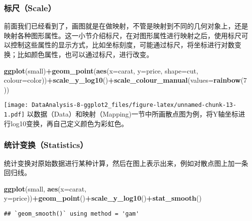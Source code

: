 \documentclass[]{article}
\newenvironment{Shaded}{\begin{snugshade}}{\end{snugshade}}
\newcommand{\KeywordTok}[1]{\textcolor[rgb]{0.13,0.29,0.53}{\textbf{#1}}}
\newcommand{\DataTypeTok}[1]{\textcolor[rgb]{0.13,0.29,0.53}{#1}}
\newcommand{\DecValTok}[1]{\textcolor[rgb]{0.00,0.00,0.81}{#1}}
\newcommand{\OperatorTok}[1]{\textcolor[rgb]{0.81,0.36,0.00}{\textbf{#1}}}
\newcommand{\NormalTok}[1]{#1}
\begin{document}
\subsubsection{标尺（Scale）}\label{scale}

前面我们已经看到了，画图就是在做映射，不管是映射到不同的几何对象上，还是映射各种图形属性。这一小节介绍标尺，在对图形属性进行映射之后，使用标尺可以控制这些属性的显示方式，比如坐标刻度，可能通过标尺，将坐标进行对数变换；比如颜色属性，也可以通过标尺，进行改变。

\begin{Shaded}
\begin{Highlighting}[]
\KeywordTok{ggplot}\NormalTok{(small)}\OperatorTok{+}\KeywordTok{geom_point}\NormalTok{(}\KeywordTok{aes}\NormalTok{(}\DataTypeTok{x=}\NormalTok{carat, }\DataTypeTok{y=}\NormalTok{price, }\DataTypeTok{shape=}\NormalTok{cut, }\DataTypeTok{colour=}\NormalTok{color))}\OperatorTok{+}\KeywordTok{scale_y_log10}\NormalTok{()}\OperatorTok{+}\KeywordTok{scale_colour_manual}\NormalTok{(}\DataTypeTok{values=}\KeywordTok{rainbow}\NormalTok{(}\DecValTok{7}\NormalTok{))}
\end{Highlighting}
\end{Shaded}

\texttt{[image: DataAnalysis-8-ggplot2\_files/figure-latex/unnamed-chunk-13-1.pdf]}
以数据（Data）和映射（Mapping)一节中所画散点图为例，将Y轴坐标进行log10变换，再自己定义颜色为彩虹色。

\subsubsection{统计变换（Statistics）}\label{statistics}

统计变换对原始数据进行某种计算，然后在图上表示出来，例如对散点图上加一条回归线。

\begin{Shaded}
\begin{Highlighting}[]
\KeywordTok{ggplot}\NormalTok{(small, }\KeywordTok{aes}\NormalTok{(}\DataTypeTok{x=}\NormalTok{carat, }\DataTypeTok{y=}\NormalTok{price))}\OperatorTok{+}\KeywordTok{geom_point}\NormalTok{()}\OperatorTok{+}\KeywordTok{scale_y_log10}\NormalTok{()}\OperatorTok{+}\KeywordTok{stat_smooth}\NormalTok{()}
\end{Highlighting}
\end{Shaded}

\begin{verbatim}
## `geom_smooth()` using method = 'gam'
\end{verbatim}
\end{document}
